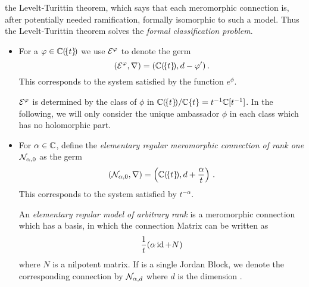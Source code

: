  the Levelt-Turittin theorem, which says
that each meromorphic connection is, after potentially needed ramification,
formally isomorphic to such a model.
Thus the Levelt-Turittin theorem solves the \emph{formal classification
problem}.
\begin{defn}\label{defn:elemnMerConnBausteine}
  \begin{itemize}
    \item For a $\varphi\in\mathbb{C}(\!\{t\}\!)$ we use $\mathcal{E}^{\varphi}$ to denote the germ
      \[
        (\mathcal{E}^{\varphi},\nabla)=(\mathbb{C}(\!\{t\}\!),d-\varphi')\,.
      \]
      This corresponds to the system satisfied by the function $e^\phi$.
      \begin{s-cor}
        $\mathcal{E}^\varphi$ is determined by the class of $\phi$ in
        $\mathbb{C}(\!\{t\}\!)/\mathbb{C}\{t\}=t^{-1}\mathbb{C}[t^{-1}]$. In the following, we will
        only consider the unique ambassador $\phi$ in each class which has no
        holomorphic part.
      \end{s-cor}
    \item For $\alpha\in\mathbb{C}$, define the \emph{elementary regular meromorphic
      connection of rank one} $\mathcal{N}_{\alpha,0}$ as the germ
      \[
        (\mathcal{N}_{\alpha,0},\nabla)=\left(\mathbb{C}(\!\{t\}\!),d+\frac{\alpha}{t}\right)
        \,.
      \]
      This corresponds to the system satisfied by $t^{-\alpha}$.

      An \emph{elementary regular model of arbitrary rank} is a meromorphic
      connection which has a basis, in which the connection Matrix can be
      written as
      \[
        \frac{1}{t} (\alpha\operatorname{id}+N)
      \]
      where $N$ is a nilpotent matrix.
      If  is a single Jordan Block, we denote the
      corresponding connection by $\mathcal{N}_{\alpha,d}$ where $d$ is the dimension
      .
  \end{itemize}
\end{defn}
